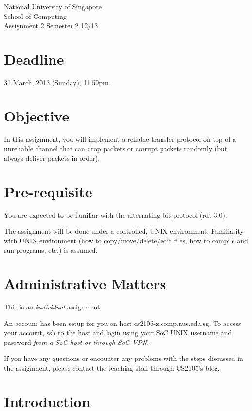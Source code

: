 \documentclass[a4paper,11pt]{exam}
\begin{document}
    \extraheadheight{.5in}
    {\large\sf National University of Singapore\\ School of Computing \\
    \LARGE\sf Assignment 2}%
    {\large\sf Semester 2 12/13}
    \firstpageheadrule
    \pagestyle{headandfoot}

    \section*{Deadline}

    31 March, 2013 (Sunday), 11:59pm.

    \section*{Objective}

    In this assignment, you will implement a reliable transfer protocol on top of a unreliable channel that can drop packets or corrupt packets randomly (but always deliver packets in order).

    \section*{Pre-requisite}

You are expected to be familiar with the alternating bit protocol (rdt 3.0).

The assignment will be done under a controlled, UNIX environment. Familiarity with UNIX environment (how to copy/move/delete/edit files, how to compile and run programs, etc.) is assumed.

\section*{Administrative Matters}

This is an \textit{individual} assignment.

An account has been setup for you on host cs2105-z.comp.nus.edu.sg. To access your account, ssh to the host and login using your SoC UNIX username and password \textit{from a SoC host or through SoC VPN}.

If you have any questions or encounter any problems with the steps discussed in the assignment, please contact the teaching staff through CS2105's blog.

\section*{Introduction}
\end{document}
